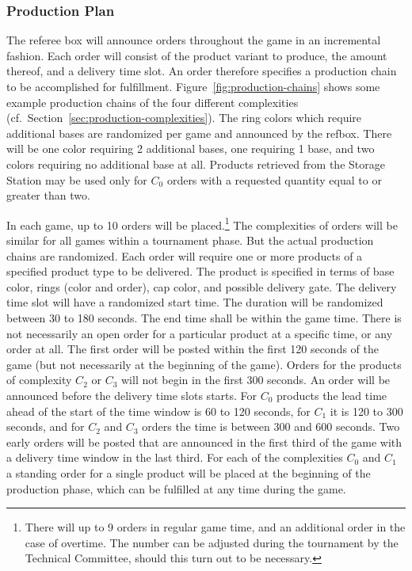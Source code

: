 \documentclass[12pt,twoside]{article}
\newcommand{\refsec}[1]{Section~\ref{#1}}
\newcommand{\reffig}[1]{Figure~\ref{#1}}
\begin{document}
\subsubsection{Production Plan}
\label{sec:production-plan}
The referee box will announce orders throughout the game in an
incremental fashion. Each order will consist of the product variant to
produce, the amount thereof, and a delivery time slot. An order
therefore specifies a production chain to be accomplished for
fulfillment. \reffig{fig:production-chains} shows some example
production chains of the four different complexities
(cf.~\refsec{sec:production-complexities}). The ring colors which
require additional bases are randomized per game and announced by the
refbox. There will be one color requiring 2 additional bases, one
requiring 1 base, and two colors requiring no additional base at
all. Products retrieved from the Storage Station may be used only for
$C_0$ orders with a requested quantity equal to or greater than two.

In each game, up to 10 orders will be placed.\footnote{There will up
  to 9 orders in regular game time, and an additional order in the
  case of overtime. The number can be adjusted during the tournament
  by the Technical Committee, should this turn out to be necessary.}
The complexities of orders will be similar for all games within a
tournament phase. But the actual production chains are
randomized. Each order will require one or more products of a
specified product type to be delivered. The product is specified in
terms of base color, rings (color and order), cap color, and possible
delivery gate. The delivery time slot will have a randomized start
time. The duration will be randomized between 30 to 180 seconds. The
end time shall be within the game time. There is not necessarily an
open order for a particular product at a specific time, or any order
at all. The first order will be posted within the first 120 seconds of
the game (but not necessarily at the beginning of the game). Orders
for the products of complexity $C_2$ or $C_3$ will not begin in the
first 300 seconds. An order will be announced before the delivery time
slots starts. For $C_0$ products the lead time ahead of the start of
the time window is 60 to 120 seconds, for $C_1$ it is 120 to 300
seconds, and for $C_2$ and $C_3$ orders the time is between 300 and
600 seconds. Two early orders will be posted that are announced in the
first third of the game with a delivery time window in the last
third. For each of the complexities $C_0$ and $C_1$ a standing order
for a single product will be placed at the beginning of the production
phase, which can be fulfilled at any time during the game.
\end{document}
